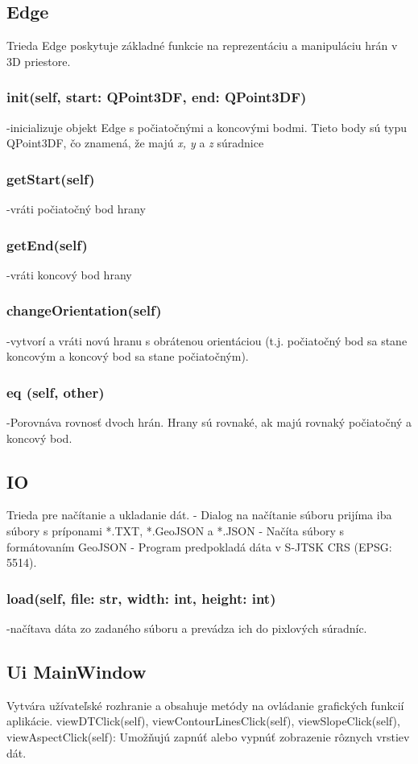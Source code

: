 \documentclass[12pt]{article}
\begin{document}
\subsection*{Edge}
Trieda Edge poskytuje základné funkcie na reprezentáciu a manipuláciu hrán v 3D priestore.
\subsubsection*{\textunderscore\textunderscore init\textunderscore\textunderscore(self, start: QPoint3DF, end: QPoint3DF)}
\noindent-inicializuje objekt Edge s počiatočnými a koncovými bodmi. Tieto body sú typu QPoint3DF, čo znamená, že majú \textit{x, y} a \textit{z} súradnice
\subsubsection*{getStart(self)}
\noindent-vráti počiatočný bod hrany
\subsubsection*{getEnd(self)}
\noindent-vráti koncový bod hrany
\subsubsection*{changeOrientation(self)}
\noindent-vytvorí a vráti novú hranu s obrátenou orientáciou (t.j. počiatočný bod sa stane koncovým a koncový bod sa stane počiatočným).
\subsubsection*{\textunderscore\textunderscore  eq \textunderscore\textunderscore (self, other)}
\noindent-Porovnáva rovnosť dvoch hrán. Hrany sú rovnaké, ak majú rovnaký počiatočný a koncový bod.
\subsection*{IO}
Trieda pre načítanie a ukladanie dát. - Dialog na načítanie súboru prijíma iba súbory s príponami *.TXT, *.GeoJSON a *.JSON - Načíta súbory s formátovaním GeoJSON - Program predpokladá dáta v S-JTSK CRS (EPSG: 5514).
\subsubsection*{load(self, file: str, width: int, height: int)}
\noindent-načítava dáta zo zadaného súboru a prevádza ich do pixlových súradníc.
\subsection*{Ui \textunderscore MainWindow}
Vytvára užívateľské rozhranie a obsahuje metódy na ovládanie grafických funkcií aplikácie. 
viewDTClick(self), viewContourLinesClick(self), viewSlopeClick(self), viewAspectClick(self):
Umožňujú zapnúť alebo vypnúť zobrazenie rôznych vrstiev dát.
\end{document}
